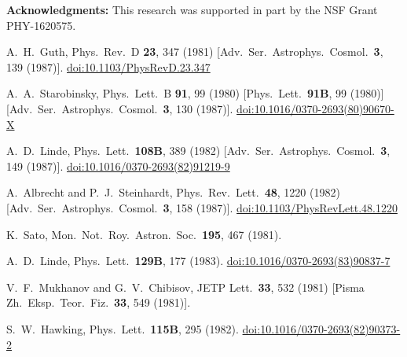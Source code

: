 \documentclass[12pt]{article}
\begin{document}
\textbf{Acknowledgments:}
This research was supported in part by the NSF Grant PHY-1620575.

\clearpage

\begin{thebibliography}{99}
  A.~H.~Guth,
  Phys.\ Rev.\ D {\bf 23}, 347 (1981)
  [Adv.\ Ser.\ Astrophys.\ Cosmol.\  {\bf 3}, 139 (1987)].
  \href{https://dx.doi.org/10.1103/PhysRevD.23.347}{doi:10.1103/PhysRevD.23.347}

  A.~A.~Starobinsky,
  Phys.\ Lett.\ B {\bf 91}, 99 (1980)
  [Phys.\ Lett.\  {\bf 91B}, 99 (1980)]
  [Adv.\ Ser.\ Astrophys.\ Cosmol.\  {\bf 3}, 130 (1987)].
  \href{https://dx.doi.org/10.1016/0370-2693(80)90670-X}{doi:10.1016/0370-2693(80)90670-X}

  A.~D.~Linde,
  Phys.\ Lett.\  {\bf 108B}, 389 (1982)
  [Adv.\ Ser.\ Astrophys.\ Cosmol.\  {\bf 3}, 149 (1987)].
  \href{https://dx.doi.org/10.1016/0370-2693(82)91219-9}{doi:10.1016/0370-2693(82)91219-9}

  A.~Albrecht and P.~J.~Steinhardt,
  Phys.\ Rev.\ Lett.\  {\bf 48}, 1220 (1982)
  [Adv.\ Ser.\ Astrophys.\ Cosmol.\  {\bf 3}, 158 (1987)].
  \href{https://dx.doi.org/10.1103/PhysRevLett.48.1220}{doi:10.1103/PhysRevLett.48.1220}

  K.~Sato,
  Mon.\ Not.\ Roy.\ Astron.\ Soc.\  {\bf 195}, 467 (1981).

  A.~D.~Linde,
  Phys.\ Lett.\  {\bf 129B}, 177 (1983).
  \href{https://dx.doi.org/10.1016/0370-2693(83)90837-7}{doi:10.1016/0370-2693(83)90837-7}

  V.~F.~Mukhanov and G.~V.~Chibisov,
  JETP Lett.\  {\bf 33}, 532 (1981)
  [Pisma Zh.\ Eksp.\ Teor.\ Fiz.\  {\bf 33}, 549 (1981)].

  S.~W.~Hawking,
  Phys.\ Lett.\  {\bf 115B}, 295 (1982).
  \href{https://dx.doi.org/10.1016/0370-2693(82)90373-2}{doi:10.1016/0370-2693(82)90373-2}


\end{thebibliography}
\end{document}
